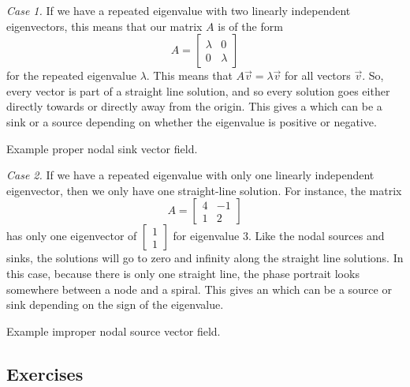 \emph{Case 1.} If we have a repeated eigenvalue with two linearly independent eigenvectors, this means that our matrix $A$ is of the form
\[ A = \begin{bmatrix} \lambda & 0 \\ 0 & \lambda \end{bmatrix} \] for the repeated eigenvalue $\lambda$. This means that $A \vec{v} = \lambda \vec{v}$ for all vectors $\vec{v}$. So, every vector is part of a straight line solution, and so every solution goes either directly towards or directly away from the origin. This gives a \emph{} which can be a sink or a source depending on whether the eigenvalue is positive or negative. 

\begin{myfig}
\capstart
{}
\caption{Example proper nodal sink vector field.\label{pln:proper-sinkfig}}
\end{myfig}

\emph{Case 2.} If we have a repeated eigenvalue with only one linearly independent eigenvector, then we only have one straight-line solution. For instance, the matrix 
\[ A = \begin{bmatrix} 4 & -1 \\ 1 & 2 \end{bmatrix} \] has only one eigenvector of $\begin{bmatrix} 1 \\ 1 \end{bmatrix}$ for eigenvalue $3$. Like the nodal sources and sinks, the solutions will go to zero and infinity along the straight line solutions. In this case, because there is only one straight line, the phase portrait looks somewhere between a node and a spiral. This gives an \emph{} which can be a source or sink depending on the sign of the eigenvalue.

\begin{myfig}
\capstart
{}
\caption{Example improper nodal source vector field.\label{pln:improper-sourcefig}}
\end{myfig}

\subsection{Exercises}

